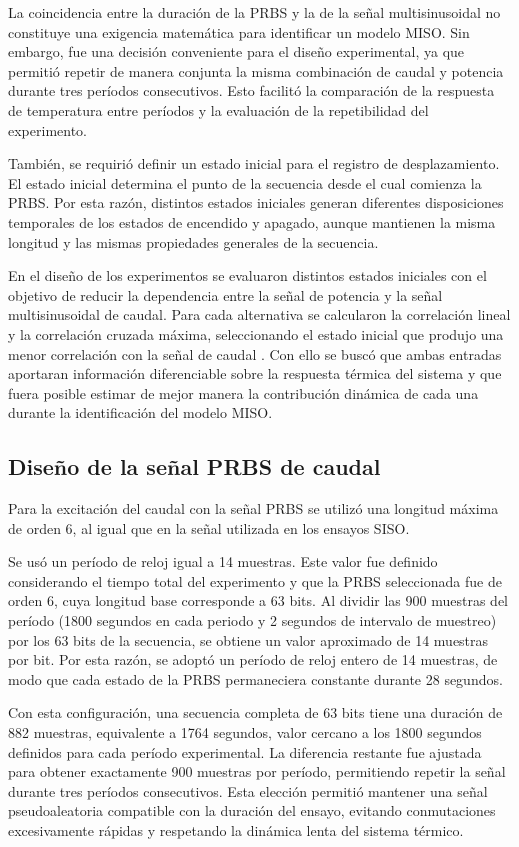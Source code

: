 \documentclass[11pt]{report}
\begin{document}
La coincidencia entre la duración de la PRBS y la de la señal multisinusoidal no constituye una exigencia matemática para identificar un modelo MISO. Sin embargo, fue una decisión conveniente para el diseño experimental, ya que permitió repetir de manera conjunta la misma combinación de caudal y potencia durante tres períodos consecutivos. Esto facilitó la comparación de la respuesta de temperatura entre períodos y la evaluación de la repetibilidad del experimento.

También, se requirió definir un estado inicial para el registro de desplazamiento. El estado inicial determina el punto de la secuencia desde el cual comienza la PRBS. Por esta razón, distintos estados iniciales generan diferentes disposiciones temporales de los estados de encendido y apagado, aunque mantienen la misma longitud y las mismas propiedades generales de la secuencia.

En el diseño de los experimentos se evaluaron distintos estados iniciales con el objetivo de reducir la dependencia entre la señal de potencia y la señal multisinusoidal de caudal. Para cada alternativa se calcularon la correlación lineal y la correlación cruzada máxima, seleccionando el estado inicial que produjo una menor correlación con la señal de caudal \cite{csurcsia2020user}. Con ello se buscó que ambas entradas aportaran información diferenciable sobre la respuesta térmica del sistema y que fuera posible estimar de mejor manera la contribución dinámica de cada una durante la identificación del modelo MISO.
\subsection{Diseño de la señal PRBS de caudal}

Para la excitación del caudal con la señal PRBS se utilizó una longitud máxima de orden 6, al igual que en la señal utilizada en los ensayos SISO.

Se usó un período de reloj igual a 14 muestras. Este valor fue definido considerando el tiempo total del experimento y que la PRBS seleccionada fue de orden 6, cuya longitud base corresponde a 63 bits. Al dividir las 900 muestras del período (1800 segundos en cada periodo y 2 segundos de intervalo de muestreo) por los 63 bits de la secuencia, se obtiene un valor aproximado de 14 muestras por bit. Por esta razón, se adoptó un período de reloj entero de 14 muestras, de modo que cada estado de la PRBS permaneciera constante durante 28 segundos.

Con esta configuración, una secuencia completa de 63 bits tiene una duración de 882 muestras, equivalente a 1764 segundos, valor cercano a los 1800 segundos definidos para cada período experimental. La diferencia restante fue ajustada para obtener exactamente 900 muestras por período, permitiendo repetir la señal durante tres períodos consecutivos. Esta elección permitió mantener una señal pseudoaleatoria compatible con la duración del ensayo, evitando conmutaciones excesivamente rápidas y respetando la dinámica lenta del sistema térmico.
\end{document}
